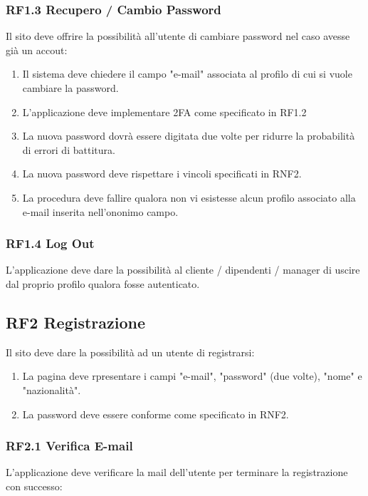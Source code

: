 \documentclass{report}
\begin{document}
	\subsubsection*{RF1.3 Recupero / Cambio Password}
	Il sito deve offrire la possibilità all'utente di cambiare password nel caso avesse già un accout:
	\begin{enumerate}
			
	\item Il sistema deve chiedere il campo "e-mail" associata al profilo di cui si vuole cambiare la password.
		\item L'applicazione deve implementare 2FA come specificato in RF1.2
		
		\item La nuova password dovrà essere digitata due volte per ridurre la probabilità di errori di battitura.
		
		\item La nuova password deve rispettare i vincoli specificati in RNF2.
		\item La procedura deve fallire qualora non vi esistesse alcun profilo associato alla e-mail inserita nell'ononimo campo.

	\end{enumerate}
	
	\subsubsection{RF1.4 Log Out}
	
	L'applicazione deve dare la possibilità al cliente / dipendenti / manager di uscire dal proprio profilo qualora fosse autenticato.

\subsection*{RF2 Registrazione}
Il sito deve dare la possibilità ad un utente di registrarsi:
\begin{enumerate}
	\item La pagina deve rpresentare i campi "e-mail", "password" (due volte), "nome" e "nazionalità". 
	\item La password deve essere conforme come specificato in RNF2.
\end{enumerate}

\subsubsection*{RF2.1 Verifica E-mail}
L'applicazione deve verificare la mail dell'utente per terminare la registrazione con successo:
\end{document}
